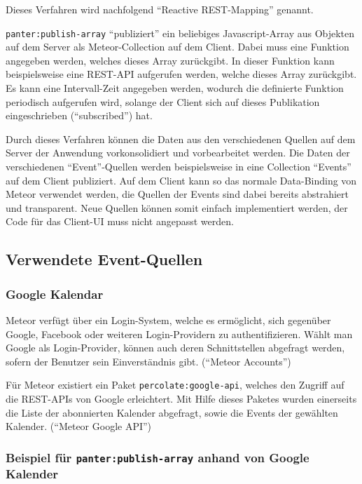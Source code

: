 \documentclass[]{article}
\begin{document}
Dieses Verfahren wird nachfolgend ``Reactive REST-Mapping'' genannt.

\lstinline!panter:publish-array! ``publiziert'' ein beliebiges
Javascript-Array aus Objekten auf dem Server als Meteor-Collection auf
dem Client. Dabei muss eine Funktion angegeben werden, welches dieses
Array zurückgibt. In dieser Funktion kann beispielsweise eine REST-API
aufgerufen werden, welche dieses Array zurückgibt. Es kann eine
Intervall-Zeit angegeben werden, wodurch die definierte Funktion
periodisch aufgerufen wird, solange der Client sich auf dieses
Publikation eingeschrieben (``subscribed'') hat.

Durch dieses Verfahren können die Daten aus den verschiedenen Quellen
auf dem Server der Anwendung vorkonsolidiert und vorbearbeitet werden.
Die Daten der verschiedenen ``Event''-Quellen werden beispielsweise in
eine Collection ``Events'' auf dem Client publiziert. Auf dem Client
kann so das normale Data-Binding von Meteor verwendet werden, die
Quellen der Events sind dabei bereits abstrahiert und transparent. Neue
Quellen können somit einfach implementiert werden, der Code für das
Client-UI muss nicht angepasst werden.

\subsection{Verwendete Event-Quellen}\label{verwendete-event-quellen}

\subsubsection{Google Kalendar}\label{google-kalendar}

Meteor verfügt über ein Login-System, welche es ermöglicht, sich
gegenüber Google, Facebook oder weiteren Login-Providern zu
authentifizieren. Wählt man Google als Login-Provider, können auch deren
Schnittstellen abgefragt werden, sofern der Benutzer sein Einverständnis
gibt. (``Meteor Accounts'')

Für Meteor existiert ein Paket \lstinline!percolate:google-api!, welches
den Zugriff auf die REST-APIs von Google erleichtert. Mit Hilfe dieses
Paketes wurden einerseits die Liste der abonnierten Kalender abgefragt,
sowie die Events der gewählten Kalender. (``Meteor Google API'')

\subsubsection{\texorpdfstring{Beispiel für
\lstinline!panter:publish-array! anhand von Google
Kalender}{Beispiel für panter:publish-array anhand von Google Kalender}}\label{beispiel-fuxfcr-panterpublish-array-anhand-von-google-kalender}
\end{document}

